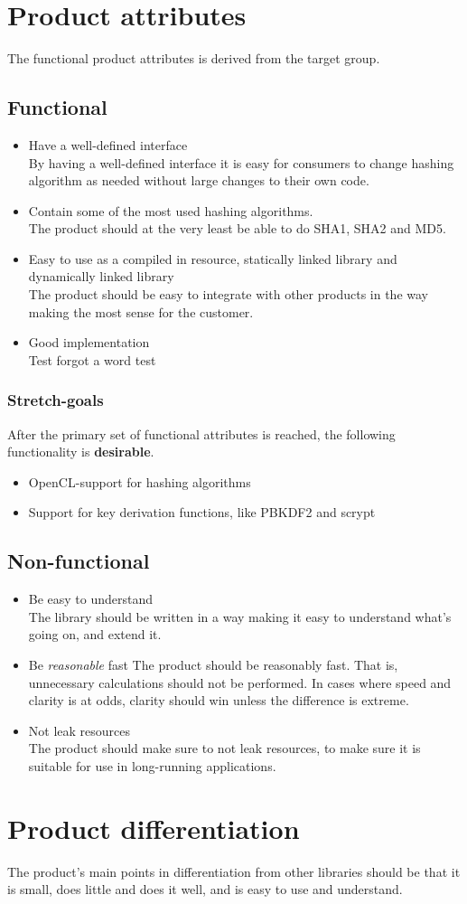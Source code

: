\documentclass[12pt]{article}
\begin{document}
\section*{Product attributes}
The functional product attributes is derived from the target group.

\subsection*{Functional}
\begin{itemize}
\item Have a well-defined interface\\
By having a well-defined interface it is easy for consumers to change hashing algorithm as needed without large changes to their own code.
\item Contain some of the most used hashing algorithms.\\
The product should at the very least be able to do SHA1, SHA2 and MD5.
\item Easy to use as a compiled in resource, statically linked library and dynamically linked library\\
The product should be easy to integrate with other products in the way making the most sense for the customer.
\item Good implementation\\
Test forgot a word test
\end{itemize}

\subsubsection*{Stretch-goals}
After the primary set of functional attributes is reached, the following functionality is \textbf{desirable}.
\begin{itemize}
\item OpenCL-support for hashing algorithms
\item Support for key derivation functions, like PBKDF2 and scrypt
\end{itemize}

\subsection*{Non-functional}
\begin{itemize}
\item Be easy to understand\\
The library should be written in a way making it easy to understand what's going on, and extend it.
\item Be \textit{reasonable} fast
The product should be reasonably fast. That is, unnecessary calculations should not be performed. In cases where speed and clarity is at odds, clarity should win unless the difference is extreme.
\item Not leak resources\\
The product should make sure to not leak resources, to make sure it is suitable for use in long-running applications.
\end{itemize}

\section*{Product differentiation}
The product's main points in differentiation from other libraries should be that it is small, does little and does it well, and is easy to use and understand.
\end{document}
